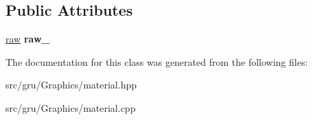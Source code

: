 \subsection*{\-Public \-Attributes}
\begin{DoxyCompactItemize}
\item 
\hypertarget{classglutpp_1_1material_1_1material_a345a3b15781a4e72450ce0fac04d7b88}{\hyperlink{structglutpp_1_1material_1_1raw}{raw} {\bfseries raw\-\_\-}}\label{classglutpp_1_1material_1_1material_a345a3b15781a4e72450ce0fac04d7b88}

\end{DoxyCompactItemize}


\-The documentation for this class was generated from the following files\-:\begin{DoxyCompactItemize}
\item 
src/gru/\-Graphics/material.\-hpp\item 
src/gru/\-Graphics/material.\-cpp\end{DoxyCompactItemize}
